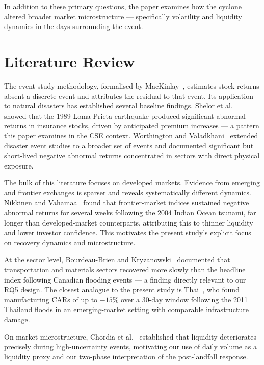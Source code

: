 \documentclass[sigconf, nonacm]{acmart}
\begin{document}
In addition to these primary questions, the paper examines how the cyclone
altered broader market microstructure --- specifically volatility and
liquidity dynamics in the days surrounding the event.

\section{Literature Review}

The event-study methodology, formalised by MacKinlay~\cite{mackinlay1997},
estimates stock returns absent a discrete event and attributes the residual
to that event. Its application to natural disasters has established several
baseline findings. Shelor et al.~\cite{shelor1992} showed that the 1989
Loma Prieta earthquake produced significant abnormal returns in insurance
stocks, driven by anticipated premium increases --- a pattern this paper
examines in the CSE context. Worthington and Valadkhani~\cite{worthington2004}
extended disaster event studies to a broader set of events and documented
significant but short-lived negative abnormal returns concentrated in sectors
with direct physical exposure.

The bulk of this literature focuses on developed markets. Evidence from
emerging and frontier exchanges is sparser and reveals systematically
different dynamics. Nikkinen and Vahamaa~\cite{nikkinen2010} found that
frontier-market indices sustained negative abnormal returns for several weeks
following the 2004 Indian Ocean tsunami, far longer than developed-market
counterparts, attributing this to thinner liquidity and lower investor
confidence. This motivates the present study's explicit focus on recovery
dynamics and microstructure.

At the sector level, Bourdeau-Brien and Kryzanowski~\cite{bourdeau2017}
documented that transportation and materials sectors recovered more slowly
than the headline index following Canadian flooding events --- a finding
directly relevant to our RQ5 design. The closest analogue to the present
study is Thai~\cite{thai2011}, who found manufacturing CARs of up to
$-15\%$ over a 30-day window following the 2011 Thailand floods in an
emerging-market setting with comparable infrastructure damage.

On market microstructure, Chordia et al.~\cite{chordia2001} established
that liquidity deteriorates precisely during high-uncertainty events,
motivating our use of daily volume as a liquidity proxy and our two-phase
interpretation of the post-landfall response.
\end{document}

